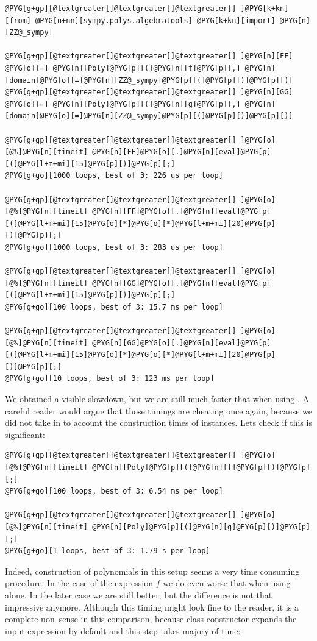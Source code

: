 \begin{Verbatim}[commandchars=@\[\]]
@PYG[g+gp][@textgreater[]@textgreater[]@textgreater[] ]@PYG[k+kn][from] @PYG[n+nn][sympy.polys.algebratools] @PYG[k+kn][import] @PYG[n][ZZ@_sympy]

@PYG[g+gp][@textgreater[]@textgreater[]@textgreater[] ]@PYG[n][FF] @PYG[o][=] @PYG[n][Poly]@PYG[p][(]@PYG[n][f]@PYG[p][,] @PYG[n][domain]@PYG[o][=]@PYG[n][ZZ@_sympy]@PYG[p][(]@PYG[p][)]@PYG[p][)]
@PYG[g+gp][@textgreater[]@textgreater[]@textgreater[] ]@PYG[n][GG] @PYG[o][=] @PYG[n][Poly]@PYG[p][(]@PYG[n][g]@PYG[p][,] @PYG[n][domain]@PYG[o][=]@PYG[n][ZZ@_sympy]@PYG[p][(]@PYG[p][)]@PYG[p][)]

@PYG[g+gp][@textgreater[]@textgreater[]@textgreater[] ]@PYG[o][@%]@PYG[n][timeit] @PYG[n][FF]@PYG[o][.]@PYG[n][eval]@PYG[p][(]@PYG[l+m+mi][15]@PYG[p][)]@PYG[p][;]
@PYG[g+go][1000 loops, best of 3: 226 us per loop]

@PYG[g+gp][@textgreater[]@textgreater[]@textgreater[] ]@PYG[o][@%]@PYG[n][timeit] @PYG[n][FF]@PYG[o][.]@PYG[n][eval]@PYG[p][(]@PYG[l+m+mi][15]@PYG[o][*]@PYG[o][*]@PYG[l+m+mi][20]@PYG[p][)]@PYG[p][;]
@PYG[g+go][1000 loops, best of 3: 283 us per loop]

@PYG[g+gp][@textgreater[]@textgreater[]@textgreater[] ]@PYG[o][@%]@PYG[n][timeit] @PYG[n][GG]@PYG[o][.]@PYG[n][eval]@PYG[p][(]@PYG[l+m+mi][15]@PYG[p][)]@PYG[p][;]
@PYG[g+go][100 loops, best of 3: 15.7 ms per loop]

@PYG[g+gp][@textgreater[]@textgreater[]@textgreater[] ]@PYG[o][@%]@PYG[n][timeit] @PYG[n][GG]@PYG[o][.]@PYG[n][eval]@PYG[p][(]@PYG[l+m+mi][15]@PYG[o][*]@PYG[o][*]@PYG[l+m+mi][20]@PYG[p][)]@PYG[p][;]
@PYG[g+go][10 loops, best of 3: 123 ms per loop]
\end{Verbatim}
\noindent
We obtained a visible slowdown, but we are still much faster that when using .
A careful reader would argue that those timings are cheating once again, because we did not
take in to account the construction times of  instances. Lets check if this is
significant:

\begin{Verbatim}[commandchars=@\[\]]
@PYG[g+gp][@textgreater[]@textgreater[]@textgreater[] ]@PYG[o][@%]@PYG[n][timeit] @PYG[n][Poly]@PYG[p][(]@PYG[n][f]@PYG[p][)]@PYG[p][;]
@PYG[g+go][100 loops, best of 3: 6.54 ms per loop]

@PYG[g+gp][@textgreater[]@textgreater[]@textgreater[] ]@PYG[o][@%]@PYG[n][timeit] @PYG[n][Poly]@PYG[p][(]@PYG[n][g]@PYG[p][)]@PYG[p][;]
@PYG[g+go][1 loops, best of 3: 1.79 s per loop]
\end{Verbatim}
\noindent
Indeed, construction of polynomials in this setup seems a very time consuming procedure. In
the case of the expression $f$ we do even worse that when using  alone. In the
later case we are still better, but the difference is not that impressive anymore. Although
this timing might look fine to the reader, it is a complete non--sense in this comparison,
because  class constructor expands the input expression by default and this
step takes majory of time:

